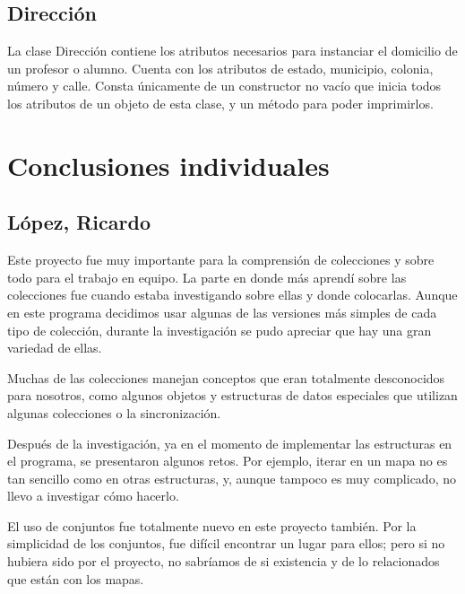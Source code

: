 \documentclass[11pt]{article}
\begin{document}
\subsection{Dirección}
\par

La clase Dirección contiene los atributos necesarios para instanciar el domicilio de un profesor o alumno. Cuenta con los atributos de estado, municipio, colonia, número y calle. Consta únicamente de un constructor no vacío que inicia todos los atributos de un objeto de esta clase, y un método para poder imprimirlos.
\section{Conclusiones individuales}
\subsection{López, Ricardo}

\par

Este proyecto fue muy importante para la comprensión de colecciones y 
sobre todo para el trabajo en equipo. La parte en donde más aprendí 
sobre las colecciones fue cuando estaba investigando sobre ellas y 
donde colocarlas. Aunque en este programa decidimos usar algunas de 
las versiones más simples de cada tipo de colección, durante la 
investigación se pudo apreciar que hay una gran variedad de ellas.

\par

Muchas de las colecciones manejan conceptos que eran totalmente 
desconocidos para nosotros, como algunos objetos y estructuras de 
datos especiales que utilizan algunas colecciones o la 
sincronización.

\par

Después de la investigación, ya en el momento de implementar las 
estructuras en el programa, se presentaron algunos retos. Por 
ejemplo, iterar en un mapa no es tan sencillo como en otras 
estructuras, y, aunque tampoco es muy complicado, no llevo a 
investigar cómo hacerlo.

\par

El uso de conjuntos fue totalmente nuevo en este proyecto también. 
Por la simplicidad de los conjuntos, fue difícil encontrar un lugar 
para ellos; pero si no hubiera sido por el proyecto, no sabríamos de 
si existencia y de lo relacionados que están con los mapas.
\end{document}
